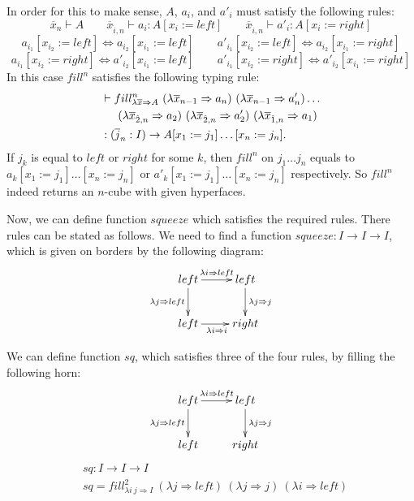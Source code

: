 \documentclass{amsart}
\theoremstyle{definition}
\theoremstyle{remark}
\newcommand{\red}{\Rightarrow}
\newcommand{\deq}{\Leftrightarrow}
\numberwithin{figure}{section}
\begin{document}
In order for this to make sense, $A$, $a_i$, and $a'_i$ must satisfy the following rules:
\[ \overline{x}_{n} \vdash A \qquad \overline{x}_{\hat{i},n} \vdash a_i : A[x_i := left] \qquad \overline{x}_{\hat{i},n} \vdash a'_i : A[x_i := right] \]
\[ a_{i_1}[x_{i_2} := left] \deq a_{i_2}[x_{i_1} := left] \qquad a'_{i_1}[x_{i_2} := left] \deq a_{i_2}[x_{i_1} := right] \]
\[ a_{i_1}[x_{i_2} := right] \deq a'_{i_2}[x_{i_1} := left] \qquad a'_{i_1}[x_{i_2} := right] \deq a'_{i_2}[x_{i_1} := right] \]
In this case $fill^n$ satisfies the following typing rule:
\begin{align*}
    & \vdash fill^n_{\lambda \overline{x} \red A}\ (\lambda \overline{x}_{n-1} \red a_n)\ (\lambda \overline{x}_{n-1} \red a'_n) \ldots \\
    & \indent (\lambda \overline{x}_{\hat{2},n} \red a_2)\ (\lambda \overline{x}_{\hat{2},n} \red a'_2)\ (\lambda \overline{x}_{\hat{1},n} \red a_1) \\
    & : (\overline{j}_n : I) \to A[x_1 := j_1] \ldots [x_n := j_n].
\end{align*}
If $j_k$ is equal to $left$ or $right$ for some $k$, then $fill^n$ on $j_1 \ldots j_n$ equals to $a_k[x_1 := j_1] \ldots [x_n := j_n]$ or $a'_k[x_1 := j_1] \ldots [x_n := j_n]$ respectively.
So $fill^n$ indeed returns an $n$-cube with given hyperfaces.

Now, we can define function $squeeze$ which satisfies the required rules.
There rules can be stated as follows.
We need to find a function $squeeze : I \to I \to I$, which is given on borders by the following diagram:
\[ \xymatrix{ left \ar[r]^{\lambda i \red left} \ar[d]_{\lambda j \red left} & left \ar[d]^{\lambda j \red j} \\
              left \ar[r]_{\lambda i \red i} & right
            }\]

We can define function $sq$, which satisfies three of the four rules, by filling the following horn:
\[ \xymatrix{ left \ar[r]^{\lambda i \red left} \ar[d]_{\lambda j \red left} & left \ar[d]^{\lambda j \red j} \\
              left & right
            }\]
\begin{align*}
    & sq : I \to I \to I \\
    & sq = fill^2_{\lambda i\ j \red I}\ (\lambda j \red left)\ (\lambda j \red j)\ (\lambda i \red left)
\end{align*}
\end{document}
